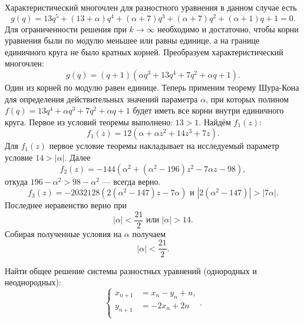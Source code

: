 \documentclass[a4paper]{article}
\begin{document}
\begin{sol}
Характеристический многочлен для разностного уравнения в данном случае есть 
\[
	g(q)=13q^5+(13+\alpha)q^4+(\alpha+7)q^3+
	(\alpha+7)q^2+\left( \alpha+1 \right) q+1=0
.\] 
Для ограниченности решения при $k\to \infty$ необходимо и
достаточно, чтобы корни уравнения  были по модулю меньшее или 
равны единице, а на границе единичного круга не было кратных
корней. Преобразуем характеристический многочлен:
\[
	g(q)=(q+1)\left(\alpha  q^3+13 q^4+7 q^2+\alpha  q+1  \right) 
.\] 
Один из корней по модулю равен единице. Теперь применим
теорему Шура-Кона для определения действительных значений
параметра $\alpha$, при которых полином
$f(q)=13 q^4+\alpha  q^3+7 q^2+\alpha  q+1 $ будет
иметь все корни внутри единичного круга. Первое из условий
теоремы выполнено: $13>1$. Найдём $f_1(z)$:
\[
	f_1(z)= 12 \left(\alpha +\alpha  z^2+14 z^3+7 z\right)
.\] 
Для $f_1(z)$ первое условие теоремы накладывает на исследуемый параметр условие $14>|\alpha|$. Далее
 \[
	 f_2(z)= -144 \left(\alpha ^2+\left(\alpha ^2-196\right) z^2-7 \alpha  z-98\right)
,\] 
откуда $196-\alpha^2>98-\alpha^2$ --- всегда верно.
\[
f_3(z)=-2032128 \left(2 \left(\alpha ^2-147\right) z-7 \alpha \right) \text{ и } \left| 2(\alpha^2-147) \right| >|7\alpha|
.\] 
Последнее неравенство верно при
\[
|\alpha|<\frac{21}{2} \text{ или } |\alpha|>14
.\] 
Собирая полученные условия на $\alpha$ получаем
\[
|\alpha|<\frac{21}{2}
.\] 
\end{sol}
\begin{hiProb}[7.12-2]
	Найти общее решение системы разностных уравнений (однородных и неоднородных):
	\[
	\left\{
	\begin{aligned}
		x_{n+1}&=x_n-y_n+n,\\
		y_{n+1}&= -2x_n+2n \\
	\end{aligned}
	\right.
	.\] 
\end{hiProb}
\end{document}
